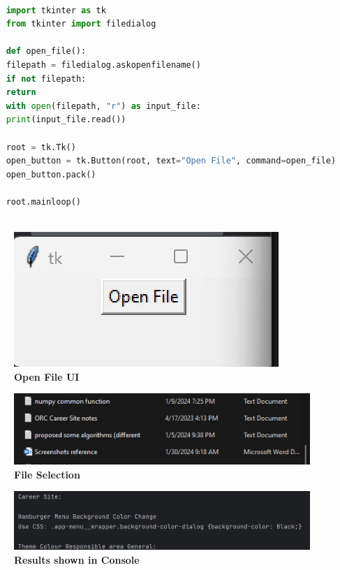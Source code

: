 \begin{lstlisting}[language=Python]
    
    import tkinter as tk
    from tkinter import filedialog
    
    def open_file():
    filepath = filedialog.askopenfilename()
    if not filepath:
    return
    with open(filepath, "r") as input_file:
    print(input_file.read())
    
    root = tk.Tk()
    open_button = tk.Button(root, text="Open File", command=open_file)
    open_button.pack()
    
    root.mainloop()
    
\end{lstlisting}

\begin{figure}[h!]
    \centering
    \includegraphics[width=\textwidth]{Images/TKinter/OpenFileFunction1}
    \caption{\textbf{Open File UI}}
\end{figure}

\begin{figure}[h!]
    \centering
    \includegraphics[width=\textwidth]{Images/TKinter/OpenFileFunction2}
    \caption{\textbf{File Selection}}
\end{figure}

\begin{figure}[h!]
    \centering
    \includegraphics[width=\textwidth]{Images/TKinter/OpenFileFunction3}
    \caption{\textbf{Results shown in Console}}
\end{figure}


